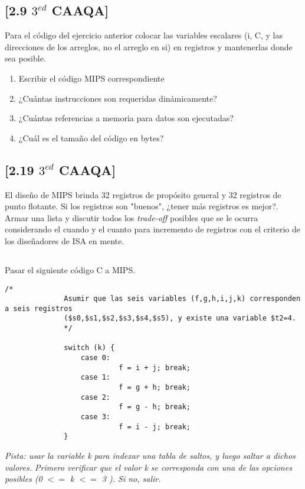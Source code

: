   
\subsection{[2.9 $3^{ed}$ CAAQA]}
Para el código del ejercicio anterior colocar las variables escalares (i, C, y las direcciones de los arreglos, no el arreglo en si) en registros y mantenerlas donde sea posible.

\begin{enumerate}
 \item Escribir el código MIPS correspondiente
 \item ¿Cuántas instrucciones son requeridas dinámicamente?
 \item ¿Cuántas referencias a memoria para datos son ejecutadas?
 \item ¿Cuál es el tamaño del código en bytes?
\end{enumerate}

\subsection{[2.19 $3^{ed}$ CAAQA]}

El diseño de MIPS brinda 32 registros de propósito general y 32 registros de punto flotante. Si los registros son "buenos", ¿tener más registros es mejor?. Armar una lista y discutir todos los \textit{trade-off} posibles que se le ocurra considerando el cuando y el cuanto para incremento de registros con el criterio de los diseñadores de ISA en mente. 

\subsection{}
      Pasar el siguiente código C a MIPS.
      \begin{small}
          \begin{lstlisting}[style=6620C]
              /*
              Asumir que las seis variables (f,g,h,i,j,k) corresponden a seis registros 
              ($s0,$s1,$s2,$s3,$s4,$s5), y existe una variable $t2=4.
              */
               
              switch (k) {
                  case 0:
                           f = i + j; break; 
                  case 1:
                           f = g + h; break;
                  case 2:
                           f = g - h; break; 
                  case 3:
                           f = i - j; break; 
              }
          \end{lstlisting}
      \end{small}
      \textit{Pista: usar la variable k para indexar una tabla de saltos, y luego 
      saltar a dichos valores.
      Primero verificar que el valor k se corresponda con una de las opciones posibles
      (0 \(<=\) k \(<=\) 3 ). Si no, salir.}
     \vfill    

